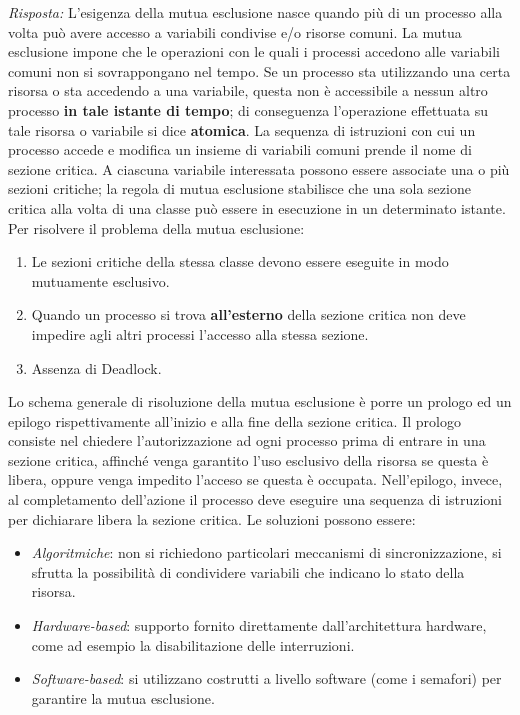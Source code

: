 \documentclass{article}
\newenvironment{solution}
    {\textit{Risposta:}}
    {}
\begin{document}
\begin{solution}
L’esigenza della mutua esclusione nasce quando più di un processo alla volta può avere accesso a variabili condivise e/o risorse comuni.
\newline
La mutua esclusione impone che le operazioni con le quali i processi accedono alle variabili comuni non si sovrappongano nel tempo.
\newline
Se un processo sta utilizzando una certa risorsa o sta accedendo a una variabile, questa non è accessibile a nessun altro processo \textbf{in tale istante di tempo}; di conseguenza l’operazione effettuata su tale risorsa o variabile si dice \textbf{atomica}.
\newline
\newline
La sequenza di istruzioni con cui un processo accede e modifica un insieme di variabili comuni prende il nome di sezione critica.
A ciascuna variabile interessata possono essere associate una o più sezioni critiche; la regola di mutua esclusione stabilisce che una sola sezione critica alla volta di una classe può essere in esecuzione in un determinato istante.
\newline
\newline
Per risolvere il problema della mutua esclusione:
\begin{enumerate}
    \item Le sezioni critiche della stessa classe devono essere eseguite in modo mutuamente esclusivo.
    \item Quando un processo si trova \textbf{all'esterno} della sezione critica non deve impedire agli altri processi l’accesso alla stessa sezione.
    \item Assenza di Deadlock.
\end{enumerate}
Lo schema generale di risoluzione della mutua esclusione è porre un prologo ed un epilogo rispettivamente all’inizio e alla fine della sezione critica.
\newline
Il prologo consiste nel chiedere l’autorizzazione ad ogni processo prima di entrare in una sezione critica, affinché venga garantito l’uso esclusivo della risorsa se questa è libera, oppure venga impedito l’acceso se questa è occupata.
\newline
Nell’epilogo, invece, al completamento dell’azione il processo deve eseguire una sequenza di istruzioni per dichiarare libera la sezione critica. Le soluzioni possono essere:
\begin{itemize}
    \item \emph{Algoritmiche}: non si richiedono particolari meccanismi di sincronizzazione, si sfrutta la possibilità di condividere variabili che indicano lo stato della risorsa.
    \item \emph{Hardware-based}: supporto fornito direttamente dall’architettura hardware, come ad esempio la disabilitazione delle interruzioni.
    \item \emph{Software-based}: si utilizzano costrutti a livello software (come i semafori) per garantire la mutua esclusione.
\end{itemize}
\end{solution}
\end{document}
